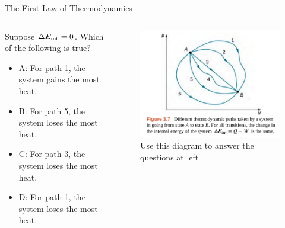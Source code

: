 \documentclass{beamer}
\begin{document}
\begin{frame}{The First Law of Thermodynamics}
\begin{columns}[T]
\begin{column}{0.5\textwidth}
\small Suppose $\Delta E_{\rm int} = 0$.  Which of the following is true?
\begin{itemize}
\item A: For path 1, the system gains the most heat.
\item B: For path 5, the system loses the most heat.
\item C: For path 3, the system loses the most heat.
\item D: For path 1, the system loses the most heat.
\end{itemize}
\end{column}
\begin{column}{0.5\textwidth}
\begin{figure}
\centering
\includegraphics[width=\textwidth]{figures/states1.png}
\caption{\label{fig:states3} Use this diagram to answer the questions at left}
\end{figure}
\end{column}
\end{columns}
\end{frame}
\end{document}
